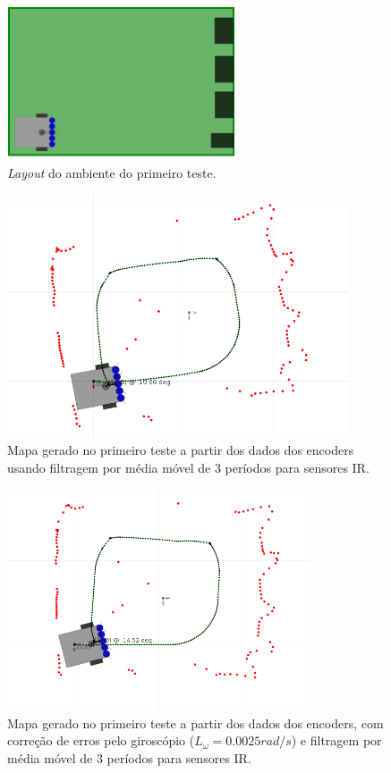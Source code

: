 \begin{figure}[H]
	\centering
	\includegraphics[width=0.6\textwidth]{./figuras/testes/teste1/layout.png}
	\caption{\textit{Layout} do ambiente do primeiro teste.}
	\label{fig:teste1_layout}
\end{figure}

\begin{figure}[H]
	\centering
	\includegraphics[width=0.9\textwidth]{./figuras/testes/teste1/mapa_encoders.png}
	\caption{Mapa gerado no primeiro teste a partir dos dados dos encoders usando filtragem por média móvel de 3 períodos para sensores IR.}
	\label{fig:teste1_mapa_encoders}
\end{figure}

\begin{figure}[H]
	\centering
	\includegraphics[width=0.8\textwidth]{./figuras/testes/teste1/mapa_encoders_giro.png}
	\caption{Mapa gerado no primeiro teste a partir dos dados dos encoders, com correção de erros pelo giroscópio ($L_\omega = 0.0025 \unit{rad/s}$) e filtragem por média móvel de 3 períodos para sensores IR.}
	\label{fig:teste1_mapa_encoders_giro}
\end{figure}

